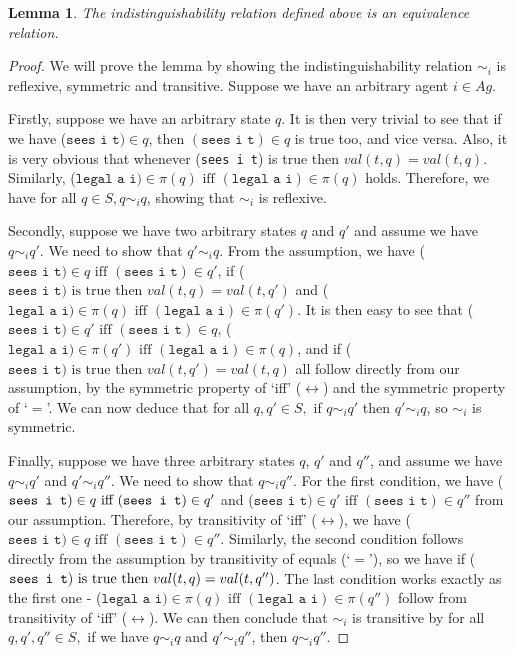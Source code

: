 \documentclass{article}
\theoremstyle{theorem}
\theoremstyle{lemma}
\newtheorem{lemma}[theorem]{Lemma}
\theoremstyle{definition}
\theoremstyle{remark}
\begin{document}
\begin{lemma}
The indistinguishability relation defined above is an equivalence relation.
\end{lemma}
\begin{proof}
  We will prove the lemma by showing the indistinguishability relation $\sim_i$ is reflexive, symmetric and transitive. Suppose we have an arbitrary agent $i \in Ag$.

  Firstly, suppose we have an arbitrary state $q$. It is then very trivial to see that if we have ($\texttt{sees i t}) \in q$, then $(\texttt{sees i t}) \in q$ is true too, and vice versa. Also, it is very obvious that whenever (\texttt{sees i t}) is true then $val(t, q) = val(t, q)$. Similarly, ($\texttt{legal a i}) \in \pi(q) \text{ iff } (\texttt{legal a i}) \in \pi(q)$ holds. Therefore, we have for all $q \in S, q \sim_i q$, showing that $\sim_i$ is reflexive.

  Secondly, suppose we have two arbitrary states $q$ and $q'$ and assume we have $q \sim_i q'$. We need to show that $q' \sim_i q$. From the assumption, we have ($\texttt{sees i t}) \in q \text{ iff } (\texttt{sees i t}) \in q'$, if ($\texttt{sees i t})\text{ is true then } val(t, q) = val(t, q')$ and ($\texttt{legal a i}) \in \pi(q) \text{ iff } (\texttt{legal a i}) \in \pi(q')$. It is then easy to see that ($\texttt{sees i t}) \in q' \text{ iff } (\texttt{sees i t}) \in q$, ($\texttt{legal a i}) \in \pi(q') \text{ iff } (\texttt{legal a i}) \in \pi(q)$, and if ($\texttt{sees i t})\text{ is true then } val(t, q') = val(t, q)$ all follow directly from our assumption, by the symmetric property of `iff' ($\leftrightarrow$) and the symmetric property of `$=$'. We can now deduce that for all $q, q' \in S,$ if $q \sim_i q'$ then $q' \sim_i q$, so $\sim_i$ is symmetric.
\par Finally, suppose we have three arbitrary states $q$, $q'$ and $q''$, and assume we have $q \sim_i q'$ and $q' \sim_i q''$. We need to show that $q \sim_i q''$. For the first condition, we have ($\texttt{sees i t}) \in q \text{ iff }\\ (\texttt{sees i t}) \in q'$ and ($\texttt{sees i t}) \in q' \text{ iff } (\texttt{sees i t}) \in q''$ from our assumption. Therefore, by transitivity of `iff' ($\leftrightarrow$), we have ($\texttt{sees i t}) \in q \text{ iff } (\texttt{sees i t}) \in q''$. Similarly, the second condition follows directly from the assumption by transitivity of equals (`$=$'), so we have if ($\texttt{sees i t})\text{ is true }\\ \text{then } val(t, q) = val(t, q'')$. The last condition works exactly as the first one - ($\texttt{legal a i}) \in \pi(q) \text{ iff } (\texttt{legal a i}) \in \pi(q'')$ follow from transitivity of `iff' ($\leftrightarrow$). We can then conclude that $\sim_i$ is transitive by for all $q, q', q'' \in S,$ if we have $q \sim_i q$ and $q' \sim_i q''$, then $q \sim_i q''$.
\end{proof}
\end{document}
